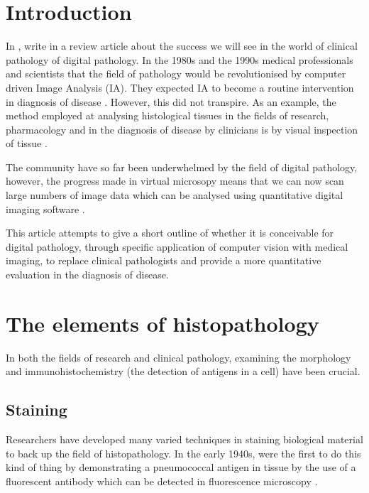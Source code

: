 \documentclass[12pt]{article}
\begin{document}
\section{Introduction}
In \citeyear{hamilton2014digital}, \citeauthor{hamilton2014digital} write in a review article about the success we 
will see in the world of clinical pathology of digital pathology. In the 1980s and the 1990s medical professionals and scientists that the field of 
pathology would be revolutionised by computer driven Image Analysis (IA). They expected IA to become a routine intervention in diagnosis 
of disease \parencite{hamilton2014digital}. However, this did not transpire. As an example, the method employed 
at analysing histological tissues in the fields of research, pharmacology and in the diagnosis of disease by clinicians is 
by visual inspection of tissue \parencite{kriete2005automated}.

The community have so far been underwhelmed by the field of digital pathology, however, the progress made in virtual microsopy 
means that we can now scan large numbers of image data which can be analysed using quantitative digital imaging 
software \parencite{mccavigan2012digital}.

This article attempts to give a short outline of whether it is conceivable for digital pathology, through specific 
application of computer vision with medical imaging, to replace clinical pathologists and provide a more quantitative 
evaluation in the diagnosis of disease.

\section{The elements of histopathology}
In both the fields of research and clinical pathology, examining the morphology and immunohistochemistry (the detection 
of antigens in a cell) have been crucial.

\subsection{Staining}
\label{sec:staining}
Researchers have developed many varied techniques  in staining biological material to back up the 
field of histopathology. In the early 1940s, \citeauthor{coons1942demonstration} were the first to do this kind of 
thing by demonstrating a pneumococcal antigen in tissue by the use of a fluorescent antibody which can be detected in 
fluorescence microscopy \parencite{coons1942demonstration}.
\end{document}
